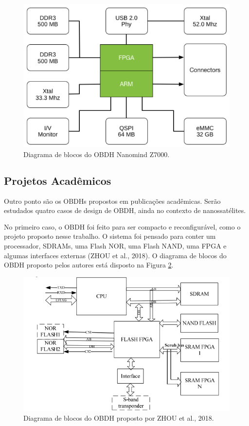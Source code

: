 \begin{figure}[H]
    \centering
    \includegraphics[scale=0.8]{images/nanomind z7000.png}
    \caption{Diagrama de blocos do OBDH Nanomind Z7000.}
    \label{fig:nanomind}
\end{figure}

\subsection{Projetos Acadêmicos}

Outro ponto são os OBDHs propostos em publicações acadêmicas. Serão estudados quatro casos de design de OBDH, ainda no contexto de nanossatélites. 

No primeiro caso, o OBDH foi feito para ser compacto e reconfigurável, como o projeto proposto nesse trabalho. O sistema foi pensado para conter um processador, SDRAMs, uma Flash NOR, uma Flash NAND, uma FPGA e algumas interfaces externas (ZHOU et al., 2018). O diagrama de blocos do OBDH proposto pelos autores está disposto na Figura \ref{fig:zhou}.

\begin{figure}[H]
    \centering
    \includegraphics[scale=0.8]{images/zhou.png}
    \caption{Diagrama de blocos do OBDH proposto por ZHOU et al., 2018.}
    \label{fig:zhou}
\end{figure}

